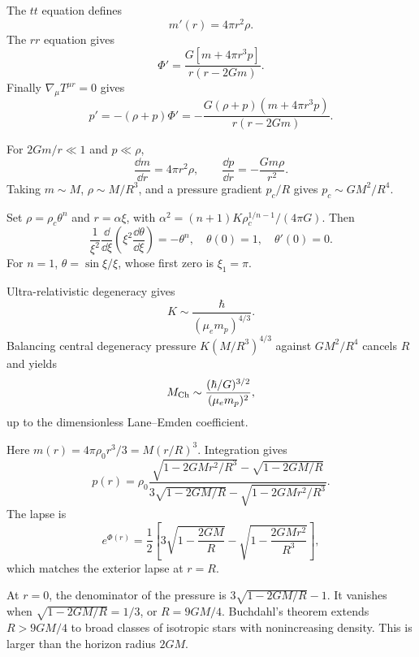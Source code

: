 \begin{solutions}

\begin{solution}
The \(tt\) equation defines
\[
m'(r)=4\pi r^2\rho.
\]
The \(rr\) equation gives
\[
\Phi'=\frac{G[m+4\pi r^3p]}{r(r-2Gm)}.
\]
Finally \(\nabla_\mu T^{\mu r}=0\) gives
\[
p'=-(\rho+p)\Phi'
=-\frac{G(\rho+p)(m+4\pi r^3p)}{r(r-2Gm)}.
\]
\end{solution}

\begin{solution}
For \(2Gm/r\ll1\) and \(p\ll\rho\),
\[
\frac{\dd m}{\dd r}=4\pi r^2\rho,\qquad
\frac{\dd p}{\dd r}=-\frac{Gm\rho}{r^2}.
\]
Taking \(m\sim M\), \(\rho\sim M/R^3\), and a pressure gradient
\(p_c/R\) gives \(p_c\sim GM^2/R^4\).
\end{solution}

\begin{solution}
Set \(\rho=\rho_c\theta^n\) and
\(r=\alpha\xi\), with
\(\alpha^2=(n+1)K\rho_c^{1/n-1}/(4\pi G)\).  Then
\[
\frac1{\xi^2}\frac{\dd}{\dd\xi}
\left(\xi^2\frac{\dd\theta}{\dd\xi}\right)=-\theta^n,
\quad \theta(0)=1,\quad\theta'(0)=0.
\]
For \(n=1\), \(\theta=\sin\xi/\xi\), whose first zero is \(\xi_1=\pi\).
\end{solution}

\begin{solution}
Ultra-relativistic degeneracy gives
\[
K\sim\frac{\hbar}{(\mu_em_p)^{4/3}}.
\]
Balancing central degeneracy pressure
\(K(M/R^3)^{4/3}\) against \(GM^2/R^4\) cancels \(R\) and yields
\[
M_{\rm Ch}\sim
\frac{(\hbar/G)^{3/2}}{(\mu_em_p)^2},
\]
up to the dimensionless Lane--Emden coefficient.
\end{solution}

\begin{solution}
Here \(m(r)=4\pi\rho_0r^3/3=M(r/R)^3\).  Integration gives
\[
p(r)=\rho_0
\frac{\sqrt{1-2GMr^2/R^3}-\sqrt{1-2GM/R}}
{3\sqrt{1-2GM/R}-\sqrt{1-2GMr^2/R^3}}.
\]
The lapse is
\[
e^{\Phi(r)}
=\frac12\left[
3\sqrt{1-\frac{2GM}{R}}
-\sqrt{1-\frac{2GMr^2}{R^3}}\right],
\]
which matches the exterior lapse at \(r=R\).
\end{solution}

\begin{solution}
At \(r=0\), the denominator of the pressure is
\(3\sqrt{1-2GM/R}-1\).  It vanishes when
\(\sqrt{1-2GM/R}=1/3\), or \(R=9GM/4\).  Buchdahl's theorem extends
\(R>9GM/4\) to broad classes of isotropic stars with nonincreasing density.
This is larger than the horizon radius \(2GM\).
\end{solution}


\end{solutions}
